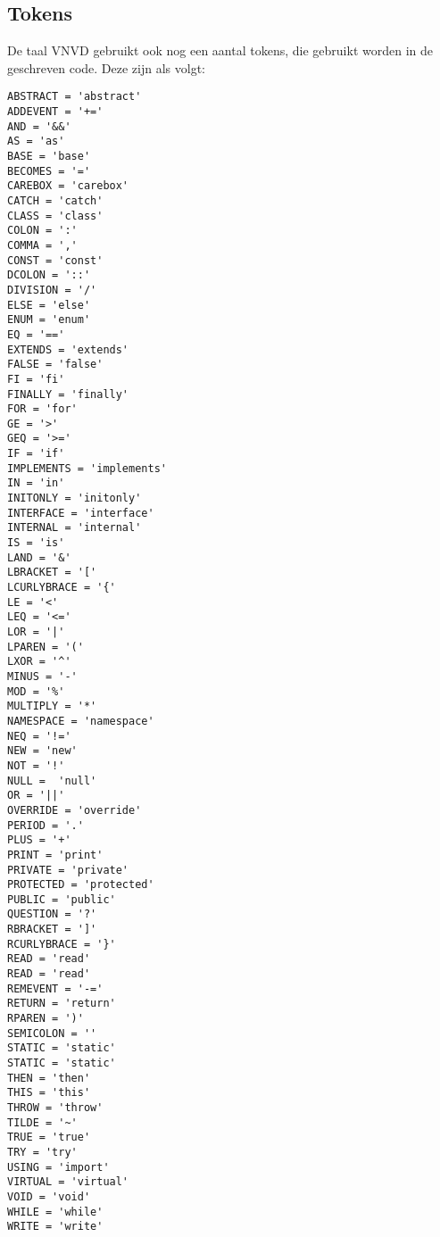 \subsection{Tokens}
De taal VNVD gebruikt ook nog een aantal tokens, die gebruikt worden in de geschreven code. Deze zijn als volgt:

\begin{lstlisting}
ABSTRACT = 'abstract'
ADDEVENT = '+='
AND = '&&'
AS = 'as'
BASE = 'base'
BECOMES = '='
CAREBOX = 'carebox'
CATCH = 'catch'
CLASS = 'class'
COLON = ':'
COMMA = ','
CONST = 'const'
DCOLON = '::'
DIVISION = '/'
ELSE = 'else'
ENUM = 'enum'
EQ = '=='
EXTENDS = 'extends'
FALSE = 'false'
FI = 'fi'
FINALLY = 'finally'
FOR = 'for'
GE = '>'
GEQ = '>='
IF = 'if'
IMPLEMENTS = 'implements'
IN = 'in'
INITONLY = 'initonly'
INTERFACE = 'interface'
INTERNAL = 'internal'
IS = 'is'
LAND = '&'
LBRACKET = '['
LCURLYBRACE = '{'
LE = '<'
LEQ = '<='
LOR = '|'
LPAREN = '('
LXOR = '^'
MINUS = '-'
MOD = '%'
MULTIPLY = '*'
NAMESPACE = 'namespace'
NEQ = '!='
NEW = 'new'
NOT = '!'
NULL =  'null'
OR = '||'
OVERRIDE = 'override'
PERIOD = '.'
PLUS = '+'
PRINT = 'print'
PRIVATE = 'private'
PROTECTED = 'protected'
PUBLIC = 'public'
QUESTION = '?'
RBRACKET = ']'
RCURLYBRACE = '}'
READ = 'read'
READ = 'read'
REMEVENT = '-='
RETURN = 'return'
RPAREN = ')'
SEMICOLON = ''
STATIC = 'static'
STATIC = 'static'
THEN = 'then'
THIS = 'this'
THROW = 'throw'
TILDE = '~'
TRUE = 'true'
TRY = 'try'
USING = 'import'
VIRTUAL = 'virtual'
VOID = 'void'
WHILE = 'while'
WRITE = 'write'
\end{lstlisting}
